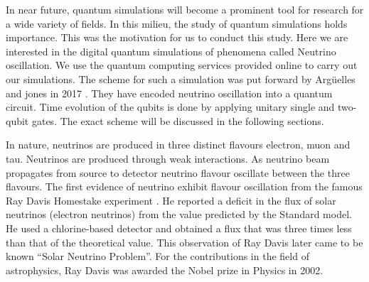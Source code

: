 \documentclass[12pt,a4paper]{report}
\begin{document}
In near future, quantum simulations will become a prominent tool for research for a wide variety of fields. In this milieu, the study of quantum simulations holds importance. This was the motivation for us to conduct this study. Here we are interested in the digital quantum simulations of phenomena called Neutrino oscillation. We use the quantum computing services provided online to carry out our simulations. The scheme for such a simulation was put forward by Arg\"uelles and jones in 2017 \cite{jones}. They have encoded neutrino oscillation into a quantum circuit. Time evolution of the qubits is done by applying unitary single and two-qubit gates. The exact scheme will be discussed in the following sections. 

In nature, neutrinos are produced in three distinct flavours electron, muon and tau. Neutrinos are produced through weak interactions. As neutrino beam propagates from source to detector neutrino flavour oscillate between the three flavours. The first evidence of neutrino exhibit flavour oscillation from the famous Ray Davis Homestake experiment \cite{ray}.  He reported a deficit in the flux of solar neutrinos (electron neutrinos)  from the value predicted by the Standard model. He used a chlorine-based detector and obtained a flux that was three times less than that of the theoretical value.  This observation of Ray Davis later came to be known “Solar Neutrino Problem”. For the contributions in the field of astrophysics, Ray Davis was awarded the Nobel prize in Physics in 2002. 
\end{document}
